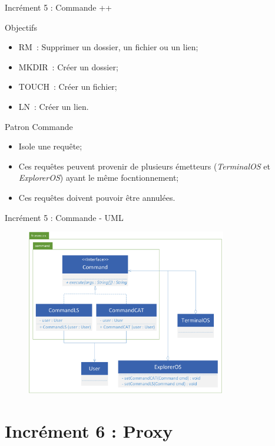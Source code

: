 \documentclass[utf8, 14pt]{beamer}
\begin{document}
	\begin{frame}{Incrément 5 : Commande ++}
		\begin{block}{Objectifs}
		\begin{itemize}
		\item RM : Supprimer un dossier, un fichier ou un lien;
		\item MKDIR : Créer un dossier;
		\item TOUCH : Créer un fichier;
		\item LN : Créer un lien.
		\end{itemize}
		\end{block}
		
		\begin{exampleblock}{Patron Commande}
		\begin{itemize}
		\item Isole une requête;
		\item Ces requêtes peuvent provenir de plusieurs émetteurs (\emph{TerminalOS} et \emph{ExplorerOS}) ayant le même focntionnement;
		\item Ces requêtes doivent pouvoir être annulées.
		\end{itemize}
		\end{exampleblock}					
	\end{frame}

	\begin{frame}{Incrément 5 : Commande - UML}
		\begin{figure}[!h]
		\centering
		\includegraphics[width=0.78\textwidth]{../uml/uml-command}
		\end{figure}		
	\end{frame}

\section{Incrément 6 : Proxy}
	
\end{document}
